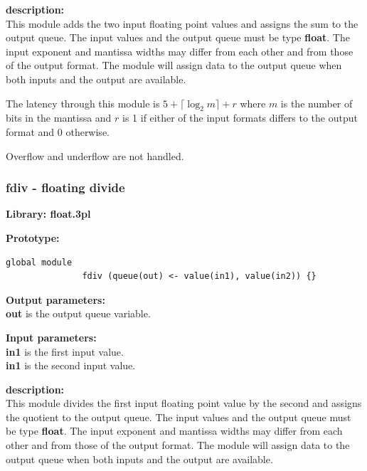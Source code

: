             {\bf description:} \\
            This module adds the two input floating point values and assigns
            the sum to the output queue. The input values and the output queue
            must be type {\bf float}. The input exponent and mantissa widths
            may differ from each other and from those of the output format. The
            module will assign data to the output queue when both inputs and the
            output are available.
            
            The latency through this module is $5 + \lceil \log_2 m \rceil + r$
            where $m$ is the number of bits in the mantissa and $r$ is 1 if
            either of the input formats differs to the output format and 0
            otherwise.
            
            Overflow and underflow are not handled.


        \subsubsection{fdiv - floating divide}\label{sec:lmfdiv}

            {\bf Library: float.3pl}

            {\bf Prototype:} \\
            \vsp
            \begin{lstlisting}[gobble=12, language=threepl]
               global module
               fdiv (queue(out) <- value(in1), value(in2)) {}
            \end{lstlisting}

            {\bf Output parameters:} \\
            {\bf out} is the output queue variable.

            {\bf Input parameters:} \\
            {\bf in1} is the first input value. \\
            {\bf in1} is the second input value.

            {\bf description:} \\
            This module divides the first input floating point value by the
            second and assigns the quotient to the output queue. The input
            values and the output queue must be type {\bf float}. The input
            exponent and mantissa widths may differ from each other and from
            those of the output format. The module will assign data to the
            output queue when both inputs and the output are available.        
            
